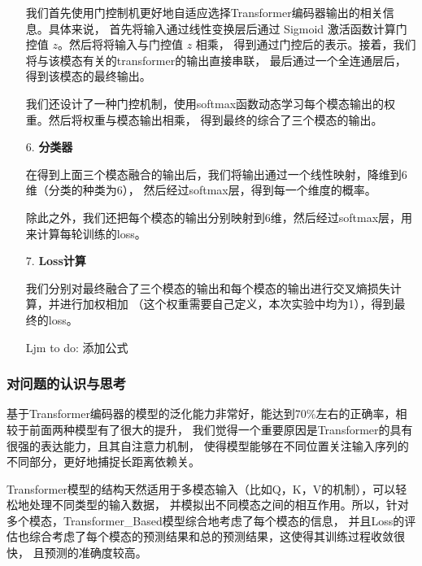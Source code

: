 \documentclass[11pt]{article}
\begin{document}
\begin{enumerate}
                我们首先使用门控制机更好地自适应选择Transformer编码器输出的相关信息。具体来说，
                首先将输入通过线性变换层后通过 Sigmoid 激活函数计算门控值 $z$。然后将将输入与门控值 $z$ 相乘，
                得到通过门控后的表示。接着，我们将与该模态有关的transformer的输出直接串联，
                最后通过一个全连通层后，得到该模态的最终输出。
                
                我们还设计了一种门控机制，使用softmax函数动态学习每个模态输出的权重。然后将权重与模态输出相乘，
                得到最终的综合了三个模态的输出。

                \item [6. ]\textbf{分类器}\par
                在得到上面三个模态融合的输出后，我们将输出通过一个线性映射，降维到6维（分类的种类为6），
                然后经过softmax层，得到每一个维度的概率。
                
                除此之外，我们还把每个模态的输出分别映射到6维，然后经过softmax层，用来计算每轮训练的loss。
                
                \item [7. ]\textbf{Loss计算}\par
                我们分别对最终融合了三个模态的输出和每个模态的输出进行交叉熵损失计算，并进行加权相加
                （这个权重需要自己定义，本次实验中均为1），得到最终的loss。
                
                Ljm to do: 添加公式

                
            \end{enumerate}

            \subsubsection{对问题的认识与思考}
            基于Transformer编码器的模型的泛化能力非常好，能达到70\%左右的正确率，相较于前面两种模型有了很大的提升，
            我们觉得一个重要原因是Transformer的具有很强的表达能力，且其自注意力机制，
            使得模型能够在不同位置关注输入序列的不同部分，更好地捕捉长距离依赖关。
            
            Transformer模型的结构天然适用于多模态输入（比如Q，K，V的机制），可以轻松地处理不同类型的输入数据，
            并模拟出不同模态之间的相互作用。所以，针对多个模态，Transformer\_Based模型综合地考虑了每个模态的信息，
            并且Loss的评估也综合考虑了每个模态的预测结果和总的预测结果，这使得其训练过程收敛很快，
            且预测的准确度较高。
            
\end{document}
